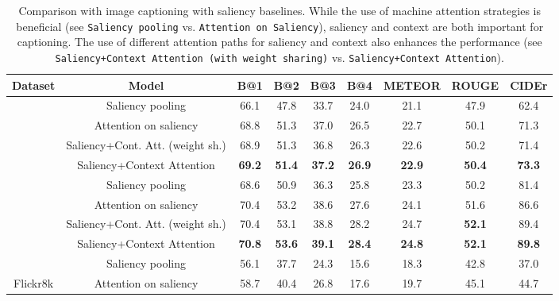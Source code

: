 \begin{table}[t]
    \begin{center}
    \renewcommand{\arraystretch}{1.2}
    \caption{Comparison with image captioning with saliency baselines. While the use of machine attention strategies is beneficial (see \texttt{Saliency pooling} vs. \texttt{Attention on Saliency}), saliency and context are both important for captioning. The use of different attention paths for saliency and context also enhances the performance (see \texttt{Saliency+Context Attention (with weight sharing)} vs. \texttt{Saliency+Context Attention}).}
    \label{tab:captioning_3}
    \begin{small}
    \begin{tabular}{|c|c|ccccccc|}
    \hline
    \footnotesize{Dataset} 	& \footnotesize{Model} & \footnotesize{B@1} & \footnotesize{B@2} &  \footnotesize{B@3} & \footnotesize{B@4} & \footnotesize{METEOR} &  \footnotesize{ROUGE} &  \footnotesize{CIDEr} \\ \hline \hline 
    \footnotesize{\multirow{4}{*}{SALICON}} 
    &  \footnotesize{Saliency pooling}  & 66.1 & 47.8 &	33.7 &	24.0 &	21.1 &	47.9 &	62.4 \\ 
    &  \footnotesize{Attention on saliency}  & 68.8 & 51.3 & 37.0 &	26.5 &	22.7 &	50.1 &	71.3 \\ 
    &   \footnotesize{Saliency+Cont. Att. (weight sh.)}  & 68.9 &	51.3 &	36.8 & 26.3 & 22.6 & 50.2 & 71.4 \\ 
    & \footnotesize{Saliency+Context Attention} & \textbf{69.2} & \textbf{51.4} & \textbf{37.2} & \textbf{26.9} & \textbf{22.9} & \textbf{50.4} & \textbf{73.3}  \\ \hline 
    \footnotesize{\multirow{4}{*}{COCO}} 
    & \footnotesize{Saliency pooling}  & 68.6 &	50.9 & 36.3 & 25.8 & 23.3 &	50.2 & 81.4 \\ 
    &  \footnotesize{Attention on saliency} & 70.4 & 53.2 & 38.6 & 27.6 & 24.1 & 51.6 &	86.6 \\ 
    &   \footnotesize{Saliency+Cont. Att. (weight sh.)}  & 70.4 & 53.1  & 38.8 & 28.2 & 24.7 & \textbf{52.1} & 89.4  \\ 
    & \footnotesize{Saliency+Context Attention} & \textbf{70.8} & \textbf{53.6}  & \textbf{39.1} & \textbf{28.4} & \textbf{24.8} & \textbf{52.1} & \textbf{89.8}  \\ \hline 
     &  \footnotesize{Saliency pooling}  & 56.1 & 37.7 & 24.3 &	15.6 & 18.3 & 42.8 & 37.0 \\ 
    \footnotesize{Flickr8k}  &  \footnotesize{Attention on saliency}  & 58.7 & 40.4 & 26.8 & 17.6 &	19.7 & 45.1 & 44.7 \\ 

\end{tabular}
\end{small}
\end{center}
\end{table}
